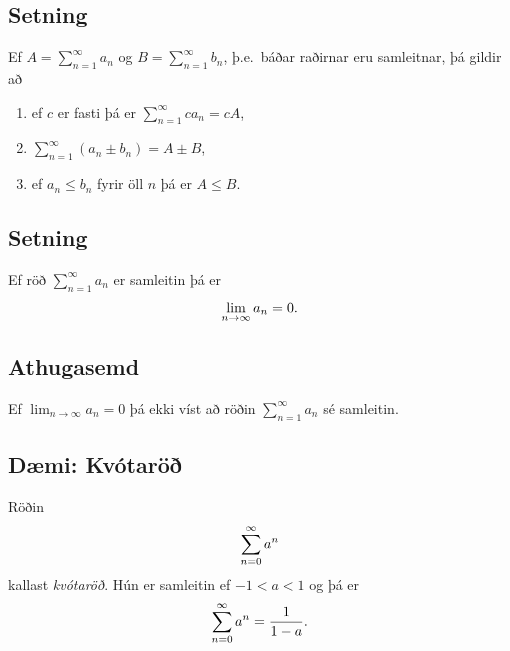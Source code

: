 \documentclass[b5paper,10pt,icelandic]{sphinxmanual}
\begin{document}
\subsection{Setning}
\label{kafli09:id7}
Ef \(A=\sum_{n=1}^\infty a_n\) og \(B=\sum_{n=1}^\infty b_n\),
þ.e. báðar raðirnar eru samleitnar, þá gildir að
\begin{enumerate}
\item {} 
ef \(c\) er fasti þá er \(\sum_{n=1}^\infty ca_n=cA\),

\item {} 
\(\sum_{n=1}^\infty (a_n\pm b_n)=A\pm B\),

\item {} 
ef \(a_n\leq b_n\) fyrir öll \(n\) þá er \(A\leq B\).

\end{enumerate}


\subsection{Setning}
\label{kafli09:id8}
Ef röð \(\sum_{n=1}^\infty a_n\) er samleitin þá er
\begin{gather}
\begin{split}\lim_{n\rightarrow\infty}a_n=0.\end{split}\notag
\end{gather}

\subsection{Athugasemd}
\label{kafli09:athugasemd}
Ef \(\lim_{n \to \infty} a_n = 0\) þá ekki víst að röðin
\(\sum_{n=1}^\infty a_n\) sé samleitin.


\subsection{Dæmi: Kvótaröð}
\label{kafli09:daemi-kvotaro}\label{kafli09:index-7}
Röðin
\begin{gather}
\begin{split}\sum_{n=0}^\infty a^n\end{split}\notag
\end{gather}
kallast \emph{kvótaröð}. Hún er samleitin ef \(-1<a<1\) og þá er
\begin{gather}
\begin{split}\sum_{n=0}^\infty a^n = \frac{1}{1-a}.\end{split}\notag
\end{gather}
\end{document}
